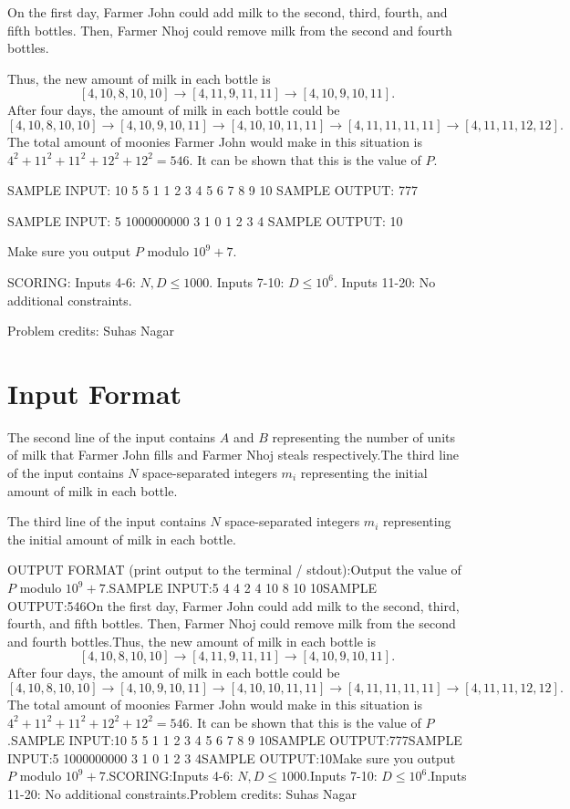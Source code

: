 \documentclass[12pt]{article}
\begin{document}
On the first day, Farmer John could add milk to the second, third,
fourth, and fifth bottles. Then, Farmer Nhoj could remove milk from the
second and fourth bottles. 

Thus, the new amount of milk in each bottle is
$$[4, 10, 8, 10, 10] \to [4, 11, 9, 11, 11] \to [4, 10, 9, 10, 11].$$
After four days, the amount of milk in each bottle could be
$$[4, 10, 8, 10, 10] \to [4, 10, 9, 10, 11] \to [4, 10, 10, 11, 11] \to [4, 11, 11, 11, 11] \to [4, 11, 11, 12, 12].$$
The total amount of moonies Farmer John would make in this situation is $4^2+11^2+11^2+12^2+12^2 = 546$. It can be shown that this is the value
of $P$.

SAMPLE INPUT:
10 5
5 1
1 2 3 4 5 6 7 8 9 10
SAMPLE OUTPUT: 
777

SAMPLE INPUT:
5 1000000000
3 1
0 1 2 3 4
SAMPLE OUTPUT: 
10

Make sure you output $P$ modulo $10^9+7$.

SCORING:
Inputs 4-6: $N,D\le 1000$. Inputs 7-10: $D\le 10^6$. Inputs 11-20: No additional constraints. 


Problem credits: Suhas Nagar



\section*{Input Format}
The second line of the input contains $A$ and $B$ representing the number of
units of milk that Farmer John fills and Farmer Nhoj steals respectively.The third line of the input contains $N$ space-separated integers $m_i$
representing the initial amount of milk in each bottle.

The third line of the input contains $N$ space-separated integers $m_i$
representing the initial amount of milk in each bottle.

OUTPUT FORMAT (print output to the terminal / stdout):Output the value of $P$ modulo $10^9+7$.SAMPLE INPUT:5 4
4 2
4 10 8 10 10SAMPLE OUTPUT:546On the first day, Farmer John could add milk to the second, third,
fourth, and fifth bottles. Then, Farmer Nhoj could remove milk from the
second and fourth bottles.Thus, the new amount of milk in each bottle is$$[4, 10, 8, 10, 10] \to [4, 11, 9, 11, 11] \to [4, 10, 9, 10, 11].$$After four days, the amount of milk in each bottle could be$$[4, 10, 8, 10, 10] \to [4, 10, 9, 10, 11] \to [4, 10, 10, 11, 11] \to [4, 11, 11, 11, 11] \to [4, 11, 11, 12, 12].$$The total amount of moonies Farmer John would make in this situation is $4^2+11^2+11^2+12^2+12^2 = 546$. It can be shown that this is the value
of $P$.SAMPLE INPUT:10 5
5 1
1 2 3 4 5 6 7 8 9 10SAMPLE OUTPUT:777SAMPLE INPUT:5 1000000000
3 1
0 1 2 3 4SAMPLE OUTPUT:10Make sure you output $P$ modulo $10^9+7$.SCORING:Inputs 4-6: $N,D\le 1000$.Inputs 7-10: $D\le 10^6$.Inputs 11-20: No additional constraints.Problem credits: Suhas Nagar
\end{document}
